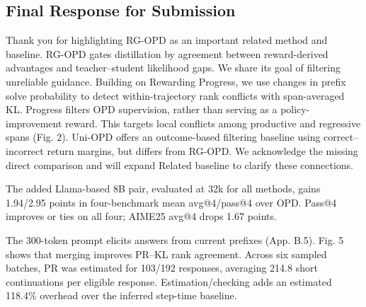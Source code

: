 \par{}
\subsection*{Final Response for Submission}
\par{}
\begin{responsebox}[frametitle={Final Response to Reviewer 4 (hTMj)},linecolor=finalgreen,backgroundcolor=finalfill]

Thank you for highlighting RG-OPD as an important related method and baseline. RG-OPD gates distillation by agreement between reward-derived advantages and teacher–student likelihood gaps. We share its goal of filtering unreliable guidance. Building on Rewarding Progress, we use changes in prefix solve probability to detect within-trajectory rank conflicts with span-averaged KL. Progress filters OPD supervision, rather than serving as a policy-improvement reward. This targets local conflicts among productive and regressive spans (Fig. 2). Uni-OPD offers an outcome-based filtering baseline using correct–incorrect return margins, but differs from RG-OPD. We acknowledge the missing direct comparison and will expand Related baseline to clarify these connections.

The added Llama-based 8B pair, evaluated at 32k for all methods, gains 1.94/2.95 points in four-benchmark mean avg@4/pass@4 over OPD. Pass@4 improves or ties on all four; AIME25 avg@4 drops 1.67 points.

The 300-token prompt elicits answers from current prefixes (App. B.5). Fig. 5 shows that merging improves PR–KL rank agreement. Across six sampled batches, PR was estimated for 103/192 responses, averaging 214.8 short continuations per eligible response. Estimation/checking adds an estimated 118.4\% overhead over the inferred step-time baseline. 



\vspace*{4\baselineskip}
\end{responsebox}

